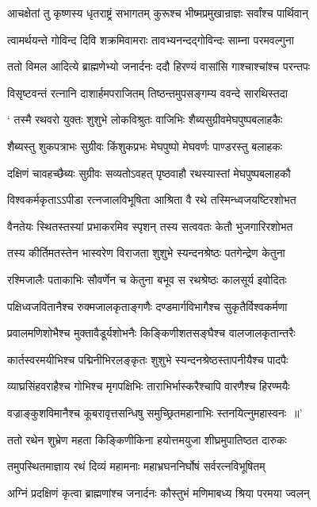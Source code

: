 \twolineshloka
{आचक्षेतां तु कृष्णस्य धृतराष्ट्रं सभागतम्}
{कुरूश्च भीष्मप्रमुखान्राज्ञः सर्वांश्च पार्थिवान्}


\twolineshloka
{त्वामर्थयन्ते गोविन्द दिवि शक्रमिवामराः}
{तावभ्यनन्दद्गोविन्दः साम्ना परमवल्गुना}


\twolineshloka
{ततो विमल आदित्ये ब्राह्मणेभ्यो जनार्दनः}
{ददौ हिरण्यं वासांसि गाश्चाश्चांश्च परन्तपः}


\twolineshloka
{विसृष्टवन्तं रत्नानि दाशार्हमपराजितम्}
{तिष्ठन्तमुपसङ्गम्य ववन्दे सारथिस्तदा}


\twolineshloka
{` तस्मै रथवरो युक्तः शुशुभे लोकविश्रुतः}
{वाजिभिः शैब्यसुग्रीवमेघपुष्पबलाहकैः}


\twolineshloka
{शैब्यस्तु शुकपत्राभः सुग्रीवः किंशुकप्रभः}
{मेघपुष्पो मेघवर्णः पाण्डरस्तु बलाहकः}


\twolineshloka
{दक्षिणं चावहच्छैब्यः सुग्रीवः सव्यतोऽवहत्}
{पृष्ठवाहौ रथस्यास्तां मेघपुष्पबलाहकौ}


\twolineshloka
{विश्वकर्मकृताऽऽपीडा रत्नजालविभूषिता}
{आश्रिता वै रथे तस्मिन्ध्वजयष्टिरशोभत}


\twolineshloka
{वैनतेयः स्थितस्तस्यां प्रभाकरमिव स्पृशन्}
{तस्य सत्ववतः केतौ भुजगारिरशोभत}


\twolineshloka
{तस्य कीर्तिमतस्तेन भास्वरेण विराजता}
{शुशुभे स्यन्दनश्रेष्ठः पतगेन्द्रेण केतुना}


\twolineshloka
{रश्मिजालैः पताकाभिः सौवर्णेन च केतुना}
{बभूव स रथश्रेष्ठः कालसूर्य इवोदितः}


\twolineshloka
{पक्षिध्वजवितानैश्च रुक्मजालकृताङ्गणैः}
{दण्डमार्गविभागैश्च सुकृतैर्विश्वकर्मणा}


\twolineshloka
{प्रवालमणिशोभैश्च मुक्तावैडूर्यशोभनैः}
{किङ्किणीशतसङ्घैश्च वालजालकृतान्तरैः}


\twolineshloka
{कार्तस्वरमयीभिश्च पद्मिनीभिरलङ्कृतः}
{शुशुभे स्यन्दनश्रेष्ठस्तापनीयैश्च पादपैः}


\twolineshloka
{व्याघ्रसिंहवराहैश्च गोभिश्च मृगपक्षिभिः}
{ताराभिर्भास्करैश्चापि वारणैश्च हिरण्मयैः}


\twolineshloka
{वज्राङ्कुशविमानैश्च कूबरावृत्तसन्धिषु}
{समुच्छ्रितमहानाभिः स्तनयित्नुमहास्वनः ॥'}


\twolineshloka
{ततो रथेन शुभ्रेण महता किङ्किणीकिना}
{हयोत्तमयुजा शीघ्रमुपातिष्ठत दारुकः}


\twolineshloka
{तमुपस्थितमाज्ञाय रथं दिव्यं महामनाः}
{महाभ्रघननिर्घोषं सर्वरत्नविभूषितम्}


\twolineshloka
{अग्निं प्रदक्षिणं कृत्वा ब्राह्मणांश्च जनार्दनः}
{कौस्तुभं मणिमाबध्य श्रिया परमया ज्वलन्}


